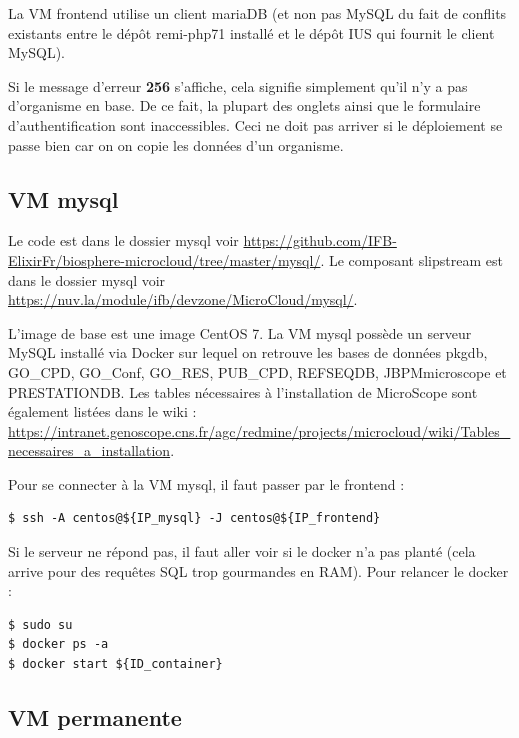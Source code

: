 La VM frontend utilise un client mariaDB (et non pas MySQL du fait de conflits existants entre le dépôt remi-php71 installé et le dépôt IUS qui fournit le client MySQL).



\begin{mycolorbox}
	Si le message d’erreur \textbf{256} s’affiche, cela signifie simplement qu’il n’y a pas d’organisme en base.
	De ce fait, la plupart des onglets ainsi que le formulaire d’authentification sont inaccessibles.
	Ceci ne doit pas arriver si le déploiement se passe bien car on on copie les données d'un organisme.
\end{mycolorbox}

\subsection {VM mysql}\label{mysql}

Le code est dans le dossier mysql voir \url{https://github.com/IFB-ElixirFr/biosphere-microcloud/tree/master/mysql/}.
Le composant slipstream est dans le dossier mysql voir \url{https://nuv.la/module/ifb/devzone/MicroCloud/mysql/}.

L'image de base est une image CentOS 7. La VM mysql possède un serveur MySQL installé via Docker sur lequel on retrouve les bases de données pkgdb, GO\_CPD, GO\_Conf, GO\_RES, PUB\_CPD, REFSEQDB, JBPMmicroscope et PRESTATIONDB. Les tables nécessaires à l'installation de MicroScope sont également listées dans le wiki : \url{https://intranet.genoscope.cns.fr/agc/redmine/projects/microcloud/wiki/Tables_necessaires_a_installation}.
\newline

Pour se connecter à la VM mysql, il faut passer par le frontend :
\begin{lstlisting}[style=bash]
$ ssh -A centos@${IP_mysql} -J centos@${IP_frontend}
\end{lstlisting}
\bigskip

Si le serveur ne répond pas, il faut aller voir si le docker n'a pas planté (cela arrive pour des requêtes SQL trop gourmandes en RAM).
Pour relancer le docker :
\begin{lstlisting}[style=bash]
$ sudo su
$ docker ps -a
$ docker start ${ID_container}
\end{lstlisting}

\subsection {VM permanente}\label{VMpermanente}

